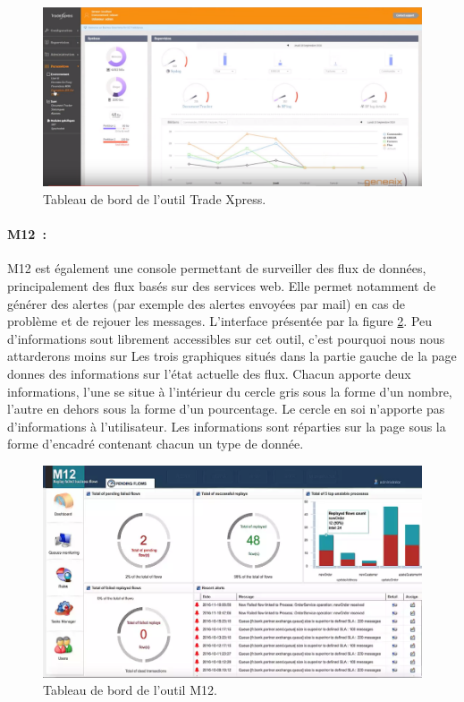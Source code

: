 			\begin{figure}[h]
				\centering
				\includegraphics[width=17cm]{../img/part2/trade_xpress.png}
				\caption{\label{trade_xpress} Tableau de bord de l'outil Trade Xpress.}
			\end{figure}
			
			\paragraph{M12~:}
			M12 est également une console permettant de surveiller des flux de données,
			principalement des flux basés sur des services web. Elle permet notamment de
			générer des alertes (par exemple des alertes envoyées par mail) en cas de
			problème et de rejouer les messages.\newline
			L'interface présentée par la figure \ref{m12}. Peu d'informations sout
			librement accessibles sur cet outil, c'est pourquoi nous nous attarderons
			moins sur Les trois graphiques situés dans la partie gauche de la page
			donnes des informations sur l'état actuelle des flux. Chacun apporte deux
			informations, l'une se situe à l'intérieur du cercle gris sous la forme d'un
			nombre, l'autre en dehors sous la forme d'un pourcentage. Le cercle en soi
			n'apporte pas d'informations à l'utilisateur.\newline
			Les informations sont réparties sur la page sous la forme d'encadré
			contenant chacun un type de donnée.
			\begin{figure}[h]
				\centering
				\includegraphics[width=17cm]{../img/part2/m12.png}
				\caption{\label{m12} Tableau de bord de l'outil M12.}
			\end{figure}
			
